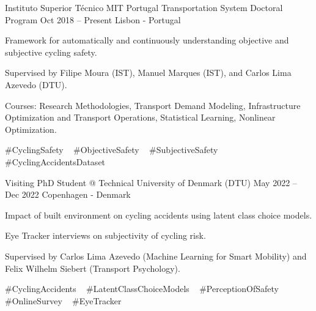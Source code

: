 

\begin{cventries}





  \cventry
    {Instituto Superior Técnico} %
    {MIT Portugal Transportation System Doctoral Program} %
    {Oct 2018 – Present} %
    {Lisbon - Portugal} %
    {
      \begin{cvitems} %
        \item {Framework for automatically and continuously understanding objective and subjective cycling safety.}
        \item {Supervised by Filipe Moura (IST), Manuel Marques (IST), and Carlos Lima Azevedo (DTU).}
        \item {Courses: Research Methodologies, Transport Demand Modeling, Infrastructure Optimization and Transport Operations, Statistical Learning, Nonlinear Optimization.}
      \end{cvitems}
    }
    {
      \#CyclingSafety ~
      \#ObjectiveSafety ~
      \#SubjectiveSafety ~
      \#CyclingAccidentsDataset ~
    }

  \cventryinner
    {Visiting PhD Student @ Technical University of Denmark (DTU)} %
    {May 2022 – Dec 2022} %
    {Copenhagen - Denmark} %
    {
      \begin{cvitems} %
        \item {Impact of built environment on cycling accidents using latent class choice models.}
        \item {Eye Tracker interviews on subjectivity of cycling risk.}
        \item {Supervised by Carlos Lima Azevedo (Machine Learning for Smart Mobility) and Felix Wilhelm Siebert (Transport Psychology).}
      \end{cvitems}
    }
    {
      \#CyclingAccidents ~
      \#LatentClassChoiceModels ~
      \#PerceptionOfSafety ~
      \#OnlineSurvey ~
      \#EyeTracker    
    }


\end{cventries}
